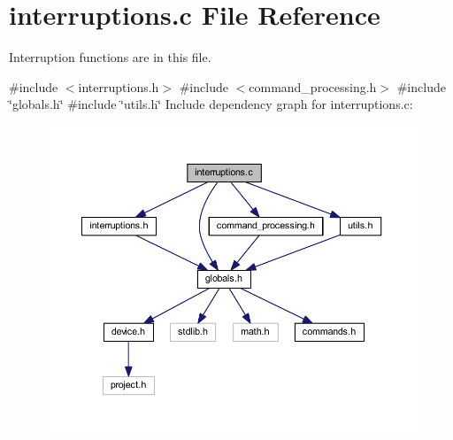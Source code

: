 \section{interruptions.\+c File Reference}
\label{interruptions_8c}


Interruption functions are in this file.  


{\ttfamily \#include $<$interruptions.\+h$>$}\newline
{\ttfamily \#include $<$command\+\_\+processing.\+h$>$}\newline
{\ttfamily \#include \char`\"{}globals.\+h\char`\"{}}\newline
{\ttfamily \#include \char`\"{}utils.\+h\char`\"{}}\newline
Include dependency graph for interruptions.\+c\+:\nopagebreak
\begin{figure}[H]
\begin{center}
\leavevmode
\includegraphics[width=350pt]{interruptions_8c__incl}
\end{center}
\end{figure}
